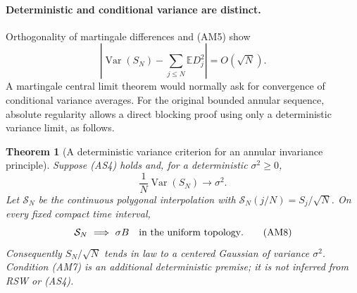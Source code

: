 \documentclass[11pt]{article}
\newtheorem{theorem}{Theorem}[section]
\theoremstyle{definition}\newtheorem{definition}[theorem]{Definition}
\theoremstyle{remark}\newtheorem{remark}[theorem]{Remark}
\begin{document}
\paragraph{Deterministic and conditional variance are distinct.}
Orthogonality of martingale differences and (AM5) show
\[
 \left|\operatorname{Var}(S_N)-\sum_{j\le N}\mathbb E D_j^2\right|
       =O(\sqrt N).
 \tag{AM6}
\]
A martingale central limit theorem would normally ask for convergence of
conditional variance averages. For the original bounded annular sequence,
absolute regularity allows a direct blocking proof using only a
deterministic variance limit, as follows.

\begin{theorem}[A deterministic variance criterion for an annular invariance principle]
\label{thm:annular-clt}
Suppose (AS4) holds and, for a deterministic $\sigma^2\ge0$,
\[
 \frac1N\operatorname{Var}(S_N)\longrightarrow\sigma^2.
 \tag{AM7}
\]
Let $\mathcal S_N$ be the continuous polygonal interpolation with
$\mathcal S_N(j/N)=S_j/\sqrt N$. On every fixed compact time interval,
\[
 \mathcal S_N\ \Longrightarrow\ \sigma B
       \quad\hbox{in the uniform topology}.
 \tag{AM8}
\]
Consequently $S_N/\sqrt N$ tends in law to a centered Gaussian of
variance $\sigma^2$. Condition (AM7) is an additional deterministic
premise; it is not inferred from RSW or (AS4).
\end{theorem}
\end{document}
